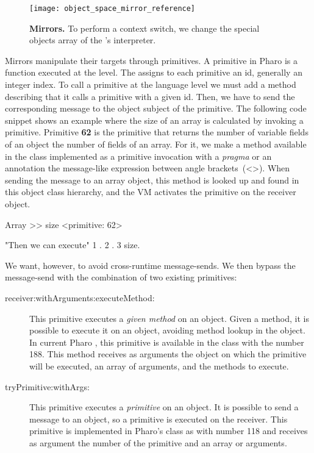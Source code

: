 \begin{figure}[htb]
\begin{center}
\texttt{[image: object\_space\_mirror\_reference]}
\caption{\textbf{Mirrors.} To perform a context switch, we change the special objects array of the \VM's interpreter.\label{fig:mirror_reference}}
\end{center}
\end{figure}

Mirrors manipulate their targets through \VM primitives. A primitive in Pharo is a function executed at the \VM level. The \VM assigns to each primitive an id, generally an integer index. To call a primitive at the language level we must add a method describing that it calls a primitive with a given id. Then, we have to send the corresponding message to the object subject of the primitive. The following code snippet shows an example where the size of an array is calculated by invoking a primitive. Primitive \textbf{62} is the primitive that returns the number of variable fields of an object \eg the number of fields of an array. For it, we make a method  available in the  class implemented as a primitive invocation with a \emph{pragma} or an annotation \ie the message-like expression between angle brackets~(<>). When sending the message  to an array object, this method is looked up and found in this object class hierarchy, and the VM activates the primitive on the receiver object.

\begin{code}
Array >> size
    <primitive: 62>

"Then we can execute"
{1 . 2 . 3} size.
\end{code}

We want, however, to avoid cross-runtime message-sends. We then bypass the message-send with the combination of two existing primitives:
\begin{description}

\item[receiver:withArguments:executeMethod:] This primitive executes a \emph{given method} on an object. Given a method, it is possible to execute it on an object, avoiding method lookup in the object. In current Pharo \VM, this primitive is available in the  class with the number 188. This method receives as arguments the object on which the primitive will be executed, an array of arguments, and the methods to execute.

\item[tryPrimitive:withArgs:] This primitive executes a \emph{primitive} on an object. It is possible to send a message to an object, so a primitive is executed on the receiver. This primitive is implemented in Pharo's  class as \textbf{} with number 118 and receives as argument the number of the primitive and an array or arguments.
\end{description}

